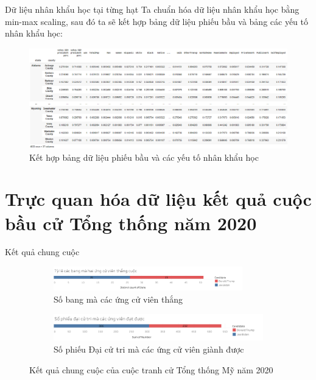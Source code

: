 \documentclass[10pt]{beamer}
\theoremstyle{remark}
\theoremstyle{definition}
\begin{document}
\begin{frame}{Dữ liệu nhân khẩu học tại từng hạt}
	Ta chuẩn hóa dữ liệu nhân khẩu học bằng min-max scaling, sau đó ta sẽ kết hợp bảng dữ liệu phiếu bầu và bảng các yếu tố nhân khẩu học:
    \begin{figure}[h!]
        \centering
        \includegraphics[width=\textwidth]{figures/President_Normalized_Demographic_Merged_Dataframe.png}
        \caption{Kết hợp bảng dữ liệu phiếu bầu và các yếu tố nhân khẩu học}
    \end{figure}
\end{frame}

\section{Trực quan hóa dữ liệu kết quả cuộc bầu cử Tổng thống năm 2020}

\begin{frame}{Kết quả chung cuộc}
	\begin{figure}[h!]
        \centering
        \begin{subfigure}[b]{\textwidth}
            \includegraphics[width=0.9\textwidth]{figures/State_Candidate_Win.png}
            \caption{Số bang mà các ứng cử viên thắng}
        \end{subfigure}
        \vfill
        \begin{subfigure}[b]{\linewidth}
            \includegraphics[width=0.9\linewidth]{figures/Electoral_Vote_Candidate_Win.png}
            \caption{Số phiếu Đại cử tri mà các ứng cử viên giành được}
        \end{subfigure}
        \caption{Kết quả chung cuộc của cuộc tranh cử Tổng thống Mỹ năm 2020}
    \end{figure}
\end{frame}
\end{document}
